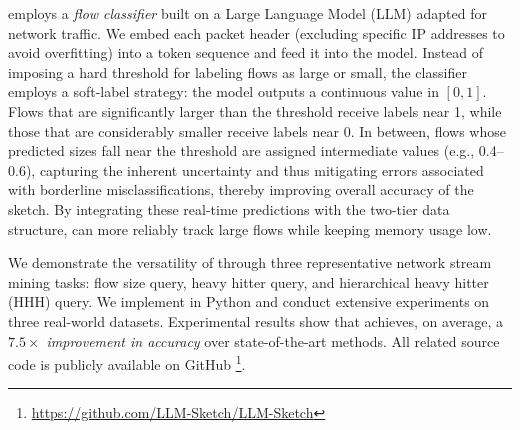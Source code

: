 %
\alg{} employs a \textit{flow classifier} built on a Large Language Model (LLM) adapted for network traffic. We embed each packet header (excluding specific IP addresses to avoid overfitting) into a token sequence and feed it into the model. Instead of imposing a hard threshold for labeling flows as large or small, the classifier employs a soft-label strategy: the model outputs a continuous value in \([0,1]\). Flows that are significantly larger than the threshold receive labels near 1, while those that are considerably smaller receive labels near 0. In between, flows whose predicted sizes fall near the threshold are assigned intermediate values (e.g., 0.4–0.6), capturing the inherent uncertainty and thus mitigating errors associated with borderline misclassifications, thereby improving overall accuracy of the sketch. By integrating these real-time predictions with the two-tier data structure, \alg{} can more reliably track large flows while keeping memory usage low.




We demonstrate the versatility of \alg{} through three representative network stream mining tasks: flow size query, heavy hitter query, and hierarchical heavy hitter (HHH) query. We implement \alg{} in Python and conduct extensive experiments on three real-world datasets. Experimental results show that \alg{} achieves, on average, a \textit{\(7.5\times\) improvement in accuracy} over state-of-the-art methods. All related source code is publicly available on GitHub \footnote{\url{https://github.com/LLM-Sketch/LLM-Sketch}}.
